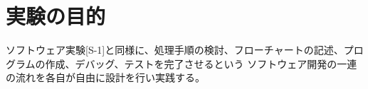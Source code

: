 

\section{実験の目的}
  ソフトウェア実験[S-1]と同様に、処理手順の検討、フローチャートの記述、プログラムの作成、デバッグ、テストを完了させるという
  ソフトウェア開発の一連の流れを各自が自由に設計を行い実践する。


